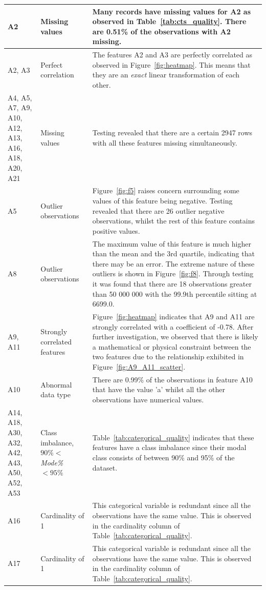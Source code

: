 \documentclass[11pt]{article}
\begin{document}
\begin{longtable}{|p{1.7cm}|p{4cm}|p{8cm}|}
	A2 & Missing values & Many records have missing values for A2 as observed in Table~\ref{tab:cts_quality}. There are 0.51\% of the observations with A2 missing. \\
	\hline
	A2, A3 & Perfect correlation & The features A2 and A3 are perfectly correlated as observed in Figure~\ref{fig:heatmap}. This means that they are an \textit{exact} linear transformation of each other.\\
	\hline
	A4, A5, A7, A9, A10, A12, A13, A16, A18, A20, A21 & Missing values & Testing revealed that there are a certain 2947 rows with all these features missing simultaneously. \\
	\hline
	A5 & Outlier observations & Figure~\ref{fig:f5} raises concern surrounding some values of this feature being negative. Testing revealed that there are 26 outlier negative observations, whilst the rest of this feature contains positive values. \\
	\hline
	A8 & Outlier observations & The maximum value of this feature is much higher than the mean and the 3rd quartile, indicating that there may be an error. The extreme nature of these outliers is shown in Figure~\ref{fig:f8}. Through testing it was found that there are 18 observations greater than 50 000 000 with the 99.9th percentile sitting at 6699.0.\\
	\hline
	A9, A11 & Strongly correlated features & Figure~\ref{fig:heatmap} indicates that A9 and A11 are strongly correlated with a coefficient of  -0.78. After further investigation, we observed that there is likely a mathematical or physical constraint between the two features due to the relationship exhibited in Figure~\ref{fig:A9_A11_scatter}.\\
	\hline
	A10 & Abnormal data type & There are 0.99\% of the observations in feature A10 that have the value 'a' whilst all the other observations have numerical values. \\
	\hline
	A14, A18, A30, A32, A42, A43, A50, A52, A53 & Class imbalance, $90\%<$\textit{Mode\%} $< 95\%$ & Table~\ref{tab:categorical_quality} indicates that these features have a class imbalance since their modal class consists of between 90\% and 95\% of the dataset. \\
	\hline
	A16 & Cardinality of 1 & This categorical variable is redundant since all the observations have the same value. This is observed in the cardinality column of Table~\ref{tab:categorical_quality}. \\
	\hline
	A17 & Cardinality of 1 & This categorical variable is redundant since all the observations have the same value. This is observed in the cardinality column of Table~\ref{tab:categorical_quality}. \\

\end{longtable}
\end{document}

